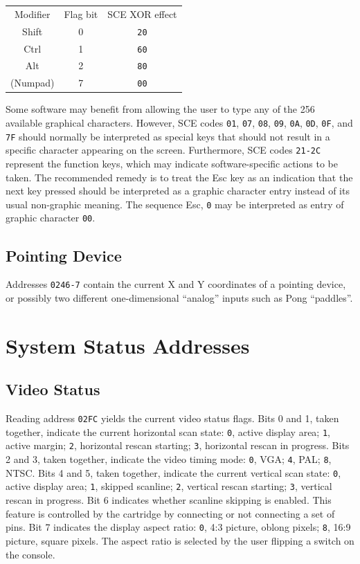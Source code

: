 \documentclass[12pt]{{memoir}}
\begin{document}
\begin{center}\begin{tabular}{ccc}
Modifier & Flag bit & SCE XOR effect \\
\textsf{Shift} & 0 & \texttt{20} \\
\textsf{Ctrl} & 1 & \texttt{60} \\
\textsf{Alt} & 2 & \texttt{80} \\
(Numpad) & 7 & \texttt{00} \\
\end{tabular}\end{center}

Some software may benefit from allowing the user to type any of the 256 available graphical characters. However, SCE codes \texttt{01}, \texttt{07}, \texttt{08}, \texttt{09}, \texttt{0A}, \texttt{0D}, \texttt{0F}, and \texttt{7F} should normally be interpreted as special keys that should not result in a specific character appearing on the screen. Furthermore, SCE codes \texttt{21-2C} represent the function keys, which may indicate software-specific actions to be taken. The recommended remedy is to treat the \textsf{Esc} key as an indication that the next key pressed should be interpreted as a graphic character entry instead of its usual non-graphic meaning. The sequence \textsf{Esc}, \texttt{0} may be interpreted as entry of graphic character \texttt{00}.

\subsection{Pointing Device}

Addresses \texttt{0246-7} contain the current X and Y coordinates of a pointing device, or possibly two different one-dimensional ``analog'' inputs such as Pong ``paddles''.

\section{System Status Addresses}
\label{sec:otherinput}

\subsection{Video Status}
\label{ss:videostatusbyte}

Reading address \texttt{02FC} yields the current video status flags. Bits 0 and 1, taken together, indicate the current horizontal scan state: \texttt{0}, active display area; \texttt{1}, active margin; \texttt{2}, horizontal rescan starting; \texttt{3}, horizontal rescan in progress. Bits 2 and 3, taken together, indicate the video timing mode: \texttt{0}, VGA; \texttt{4}, PAL; \texttt{8}, NTSC. Bits 4 and 5, taken together, indicate the current vertical scan state: \texttt{0}, active display area; \texttt{1}, skipped scanline; \texttt{2}, vertical rescan starting; \texttt{3}, vertical rescan in progress. Bit 6 indicates whether scanline skipping is enabled. This feature is controlled by the cartridge by connecting or not connecting a set of pins. Bit 7 indicates the display aspect ratio: \texttt{0}, 4:3 picture, oblong pixels; \texttt{8}, 16:9 picture, square pixels. The aspect ratio is selected by the user flipping a switch on the console.
\end{document}
